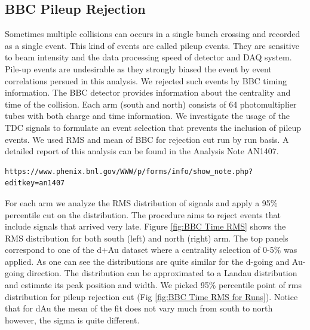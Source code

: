 \documentclass{article}
\begin{document}
\subsection{BBC Pileup Rejection}
Sometimes multiple collisions can occurs in a single bunch crossing and recorded as a single event.
This kind of events are called pileup events.
They are sensitive to beam intensity and the data processing speed of detector and DAQ system.
Pile-up events are undesirable as they strongly biased the event by event correlations persued in this analysis.
We rejected such events by BBC timing information.
\newline
The BBC detector provides information about the centrality and time of the collision.
Each arm (south and north) consists of 64 photomultiplier tubes with both charge and time information.
We investigate the usage of the TDC signals to formulate an event selection that prevents the inclusion of pileup events.
We used RMS and mean of BBC for rejection cut run by run basis.
A detailed report of this analysis can be found in the Analysis Note AN1407.
\begin{verbatim}
https://www.phenix.bnl.gov/WWW/p/forms/info/show_note.php?editkey=an1407
\end{verbatim}
\newline
For each arm we analyze the RMS distribution of signals and apply a 95\% percentile cut on the distribution.
The procedure aims to reject events that include signals that arrived very late.
Figure \ref{fig:BBC Time RMS} shows the RMS distribution for both south (left) and north (right) arm.
The top panels correspond to one of the d+Au dataset where a centrality selection of 0-5$\%$ was applied.
As one can see the distributions are quite similar for the d-going and Au-going direction.
The distribution can be approximated to a Landau distribution and estimate its peak position and width.
We picked 95\% percentile point of rms distribution for pileup rejection cut (Fig \ref{fig:BBC Time RMS for Runs}).
Notice that for dAu the mean of the fit does not vary much from south to north however, the sigma is quite different.
\end{document}
